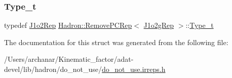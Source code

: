 \mbox{\label{structHadron_1_1RemovePCRep_3_01J1o2gRep_01_4_a67f5c615c77485f1e07838b2ef1e6317}} 
\subsubsection{\texorpdfstring{Type\_t}{Type\_t}\hspace{0.1cm}{\footnotesize\ttfamily [2/2]}}
{\footnotesize\ttfamily typedef \mbox{\hyperlink{structHadron_1_1J1o2Rep}{J1o2\+Rep}} \mbox{\hyperlink{structHadron_1_1RemovePCRep}{Hadron\+::\+Remove\+P\+C\+Rep}}$<$ \mbox{\hyperlink{structHadron_1_1J1o2gRep}{J1o2g\+Rep}} $>$\+::\mbox{\hyperlink{structHadron_1_1RemovePCRep_3_01J1o2gRep_01_4_a67f5c615c77485f1e07838b2ef1e6317}{Type\+\_\+t}}}



The documentation for this struct was generated from the following file\+:\begin{DoxyCompactItemize}
\item 
/\+Users/archanar/\+Kinematic\+\_\+factor/adat-\/devel/lib/hadron/do\+\_\+not\+\_\+use/\mbox{\hyperlink{adat-devel_2lib_2hadron_2do__not__use_2do__not__use_8irreps_8h}{do\+\_\+not\+\_\+use.\+irreps.\+h}}\end{DoxyCompactItemize}
